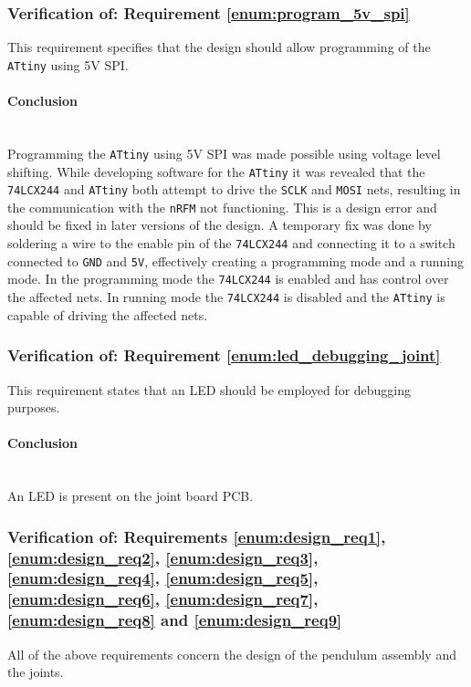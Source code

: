 \subsubsection{Verification of: Requirement \ref{enum:program_5v_spi}} %
\label{ssub:verification_of_requirement:enum:program_5v_spi}
This requirement specifies that the design should allow programming of the \texttt{ATtiny} using 5V SPI.

\paragraph{Conclusion}~\\
Programming the \texttt{ATtiny} using 5V SPI was made possible using voltage level shifting.
While developing software for the \texttt{ATtiny} it was revealed that the \texttt{74LCX244} and \texttt{ATtiny} both attempt to drive the \texttt{SCLK} and \texttt{MOSI} nets, resulting in the communication with the \texttt{nRFM} not functioning.
This is a design error and should be fixed in later versions of the design.
A temporary fix was done by soldering a wire to the enable pin of the \texttt{74LCX244} and connecting it to a switch connected to \texttt{GND} and \texttt{5V}, effectively creating a programming mode and a running mode.
In the programming mode the \texttt{74LCX244} is enabled and has control over the affected nets.
In running mode the \texttt{74LCX244} is disabled and the \texttt{ATtiny} is capable of driving the affected nets.

\subsubsection{Verification of: Requirement \ref{enum:led_debugging_joint}} %
\label{ssub:verification_of_requirement_enum:led_debugging_joint}
This requirement states that an LED should be employed for debugging purposes.

\paragraph{Conclusion}~\\
An LED is present on the joint board PCB.


\subsubsection{Verification of: Requirements \ref{enum:design_req1}, \ref{enum:design_req2}, \ref{enum:design_req3}, \ref{enum:design_req4}, \ref{enum:design_req5}, \ref{enum:design_req6}, \ref{enum:design_req7}, \ref{enum:design_req8} and \ref{enum:design_req9}} %
All of the above requirements concern the design of the pendulum assembly and the joints.
